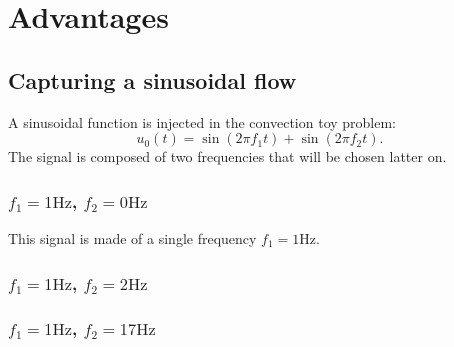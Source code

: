 \section{Advantages} %
\label{sec:advantages}

\subsection{Capturing a sinusoidal flow} %
\label{sub:capturing_a_sinusoidal_flow}

A sinusoidal function is injected in the convection toy problem:
\begin{equation}
	u_0(t) = \sin (2 \pi f_1 t) + \sin(2 \pi f_2 t).
\end{equation}
The signal is composed of two frequencies that will 
be chosen latter on.

\subsubsection{$f_1 = 1 \text{Hz}$, $f_2 = 0 \text{Hz}$}

This signal is made of a single frequency $f_1 = 1 \text{Hz}$.


\subsubsection{$f_1 = 1 \text{Hz}$, $f_2 = 2 \text{Hz}$}

\subsubsection{$f_1 = 1 \text{Hz}$, $f_2 = 17 \text{Hz}$}


